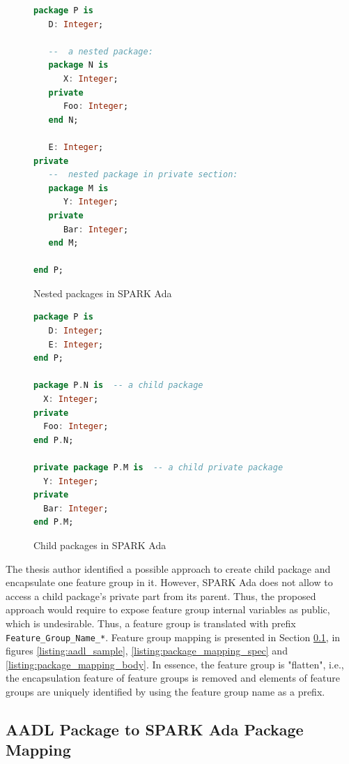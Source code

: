 \begin{figure}[ht]
\singlespacing
\begin{lstlisting}[language=ada, frame=single, gobble=0]
package P is
   D: Integer;

   --  a nested package:
   package N is
      X: Integer;
   private
      Foo: Integer;
   end N;

   E: Integer;
private
   --  nested package in private section:
   package M is
      Y: Integer;
   private
      Bar: Integer;
   end M;

end P;
\end{lstlisting}
\doublespacing
\caption{Nested packages in SPARK Ada}
\label{listing:nested_packages}
\end{figure}

\begin{figure}[ht]
\singlespacing
\begin{lstlisting}[language=ada, frame=single, gobble=0]
package P is
   D: Integer;
   E: Integer;
end P;

package P.N is 	-- a child package
  X: Integer;
private
  Foo: Integer;
end P.N;

private package P.M is 	-- a child private package
  Y: Integer;
private
  Bar: Integer;
end P.M;
\end{lstlisting}
\doublespacing
\caption{Child packages in SPARK Ada}
\label{listing:child_packages}
\end{figure}

\clearpage

The thesis author identified a possible approach to create child package and encapsulate one feature group in it. However, SPARK Ada does not allow to access a child package's private part from its parent. Thus, the proposed approach would require to expose feature group internal variables as public, which is undesirable. Thus, a feature group is translated with prefix \lstinline{Feature_Group_Name_*}. Feature group mapping is presented in Section \ref{codegen:mapping:packages}, in figures \ref{listing:aadl_sample}, \ref{listing:package_mapping_spec} and \ref{listing:package_mapping_body}. In essence, the feature group is "flatten", i.e., the encapsulation feature of feature groups is removed and elements of feature groups are uniquely identified by using the feature group name as a prefix.


\subsection{AADL Package to SPARK Ada Package Mapping}
\label{codegen:mapping:packages}


